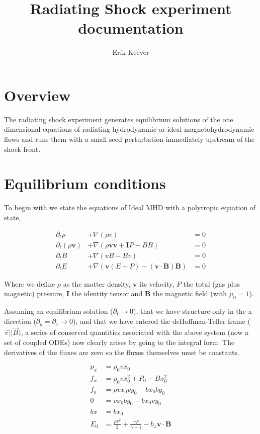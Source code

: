 \documentclass[letterpaper,12pt,twocolumn]{article}
\author{Erik Keever}
\title{Radiating Shock experiment documentation}
\begin{document}
 

\maketitle

\section{Overview}

The radiating shock experiment generates equilibrium solutions of the one 
dimensional equations of radiating hydrodynamic or ideal magnetohydrodynamic flows
and runs them with a small seed perturbation immediately upstream of the shock front.

\section{Equilibrium conditions}

To begin with we state the equations of Ideal MHD with a polytropic equation of state,

\begin{subequations} \label{fulleqns}
\begin{align}
\partial_t \rho &+  \nabla (\rho v) &= 0 \\
\partial_t (\rho \mathbf{v}) &+ \nabla (\rho \mathbf{v} \mathbf{v} + \mathbf{I} P - B B) &= 0 \\
\partial_t B &+ \nabla (v B - B v) &= 0 \\
\partial_t E &+ \nabla (\mathbf{v}(E+P) - (\mathbf{v} \cdot \mathbf{B})\mathbf{B} ) &= 0
\end{align}
\end{subequations}

Where we define $\rho$ as the matter density, $\mathbf{v}$ its velocity, $P$ the total (gas plus magnetic) pressure, $\mathbf{I}$ the identity tensor and $\mathbf{B}$ the magnetic field (with $\mu_0 = 1$).

Assuming an equilibrium solution ($\partial_t \rightarrow 0$), that we have structure 
only in the x direction ($\partial_y = \partial_z \rightarrow 0$), and that we have 
entered the deHoffman-Teller frame ($\vec{v} || \vec{B})$, a 
series of conserved quantities associated with the above system (now a set of coupled ODEs) 
now clearly arises by going to the integral form: The derivatives of the fluxes are zero
so the fluxes themselves must be constants.

\begin{subequations} \label{invariants}
\begin{align}
p_x &= \rho_0 vx_0 \\
f_x &= \rho_0 vx_0^2 + P_0 - Bx_0^2 \\
f_y &= \rho vx_0 vy_0 - bx_0 by_0 \\
0 &= vx_0 by_0 - bx_0 vy_0 \\
bx &= bx_0 \\
E_0 &= \frac{\rho v^2}{2} + \frac{\gamma P}{\gamma-1} - b_x \mathbf{v} \cdot \mathbf{B}
\end{align}
\end{subequations}
\end{document}
